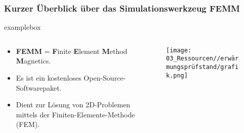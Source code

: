 \begin{frame}
    \frametitle{Kurzer Überblick über das Simulationswerkzeug FEMM}
    \begin{beamercolorbox}[wd=\textwidth, sep=1ex, rounded=true, shadow=true]{examplebox}
        \begin{columns}[T]
            \begin{column}{0.55\textwidth}
                \begin{itemize}
                    \item \textbf{FEMM} = \textbf{F}inite \textbf{E}lement \textbf{M}ethod \textbf{M}agnetics.
                    \item Es ist ein kostenloses Open-Source-Softwarepaket.
                    \item Dient zur Lösung von 2D-Problemen mittels der Finiten-Elemente-Methode (FEM).
                \end{itemize}
            \end{column}

            \begin{column}{0.3\textwidth}




                \begin{figure}
                    \centering
                    \texttt{[image: 03\_Ressourcen//erwärmungsprüfstand/grafik.png]}
                \end{figure}
            \end{column}
        \end{columns}
    \end{beamercolorbox}
\end{frame}











